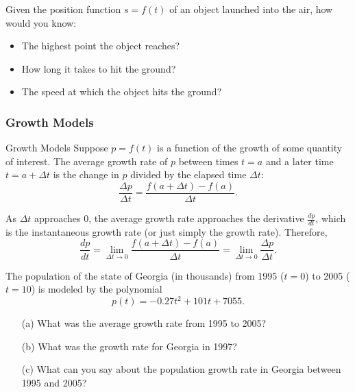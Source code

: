 \documentclass[cal1spr16Lectures.tex]{subfiles}
\begin{document}
\begin{frame}
\begin{que} Given the position function $s=f(t)$ of an object launched into the air, how would you know:
\begin{itemize}
	\item The highest point the object reaches?
	\item How long it takes to hit the ground?
	\item The speed at which the object hits the ground?
\end{itemize}
\end{que}
\end{frame}

\subsubsection{Growth Models}

\begin{frame}{\small Growth Models}
Suppose $p=f(t)$ is a function of the growth of some quantity of interest.  The average growth rate of $p$ between times $t=a$ and a later time $t=a+\Delta t$ is the change in $p$ divided by the elapsed time $\Delta t$:
\[\frac{\Delta p}{\Delta t}=\frac{f(a+\Delta t)-f(a)}{\Delta t}.\]
\end{frame}

\begin{frame}{}
As $\Delta t$ approaches 0, the average growth rate approaches the derivative $\frac{dp}{dt}$, which is the instantaneous growth rate (or just simply the growth rate).  Therefore,
\[\frac{dp}{dt}=\lim_{\Delta t \to 0} \frac{f(a+\Delta t)-f(a)}{\Delta t} = \lim_{\Delta t \to 0} \frac{\Delta p}{\Delta t}.\]
\end{frame}

\begin{frame}
\begin{exe} The population of the state of Georgia (in thousands) from 1995 ($t=0$) to 2005 ($t=10$) is modeled by the polynomial 
\[p(t)=-0.27t^2+101t+7055.\]
\begin{itemize}
	\item[(a)] What was the average growth rate from 1995 to 2005?
	\item[(b)] What was the growth rate for Georgia in 1997?
	\item[(c)] What can you say about the population growth rate in Georgia between 1995 and 2005?
\end{itemize}
\end{exe}
\end{frame}
\end{document}
